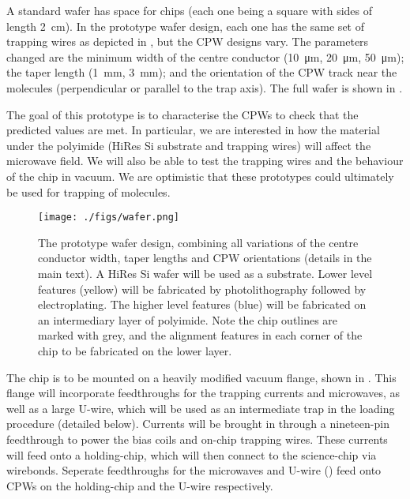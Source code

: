 A standard  wafer has space for  chips (each one being
a square with sides of length \SI{2}{\centi\metre}). In the prototype wafer
design, each one has the same set of trapping wires as depicted in
, but the CPW designs vary. The parameters
changed are the minimum width of the centre conductor (\SI{10}{\micro\metre},
\SI{20}{\micro\metre}, \SI{50}{\micro\metre}); the taper length
(\SI{1}{\milli\metre}, \SI{3}{\milli\metre}); and the orientation of the CPW
track near the molecules (perpendicular or parallel to the trap axis). The full
wafer is shown in .

The goal of this prototype is to characterise the CPWs to check that the
predicted values are met. In particular, we are interested in how the material
under the polyimide (HiRes Si substrate and trapping wires) will affect the
microwave field. We will also be able to test the trapping wires and the
behaviour of the chip in vacuum. We are optimistic that these prototypes could
ultimately be used for trapping of molecules.

\begin{figure}[tph]
  \texttt{[image: ./figs/wafer.png]}
  \caption{
    The prototype wafer design, combining all variations of the centre conductor
    width, taper lengths and CPW orientations (details in the main text). A
     HiRes Si wafer will be used as a substrate. Lower level
    features (yellow) will be fabricated by photolithography followed by
    electroplating. The higher level features (blue) will be fabricated on an
    intermediary layer of polyimide. Note the chip outlines are marked with
    grey, and the alignment features in each corner of the chip to be fabricated
    on the lower layer.
  }
  \label{experiment:fig:chipdesign}
\end{figure}



The chip is to be mounted on a heavily modified vacuum flange, shown in
. This flange will incorporate feedthroughs for
the trapping currents and microwaves, as well as a large U-wire, which will be
used as an intermediate trap in the loading procedure (detailed below). Currents
will be brought in through a nineteen-pin feedthrough  to power the bias coils
and on-chip trapping wires. These currents will feed onto a holding-chip, which
will then connect to the science-chip via wirebonds. Seperate feedthroughs for
the microwaves and U-wire () feed onto CPWs on the holding-chip and
the U-wire respectively.

